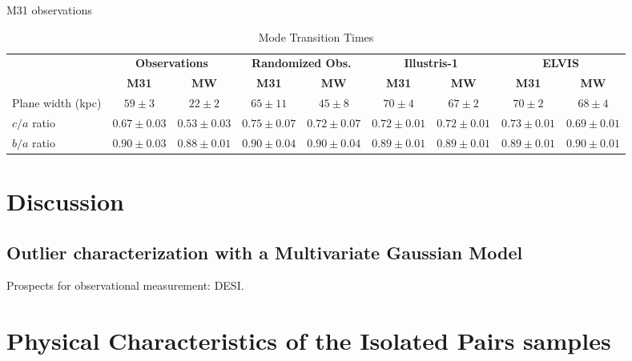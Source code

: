 \documentclass[a4paper,fleqn,usenatbib]{mnras}
\begin{document}
M31 observations 


\begin{table}
  \centering
  \renewcommand{\arraystretch}{1.2}
  \begin{tabular}{|p{2.5cm}|c|c|c|c|c|c|c|c|}
    \hline
    \multirow{2}{4.0cm}{} & \multicolumn{2}{c|}{\textbf{Observations}} & \multicolumn{2}{c|}{\textbf{Randomized Obs.}} & \multicolumn{2}{c|}{\textbf{Illustris-1}} & \multicolumn{2}{c|}{\textbf{ELVIS}}\\
    \cline{2-9}
    & \textbf{M31} & \textbf{MW} & \textbf{M31} & \textbf{MW} & \textbf{M31} & \textbf{MW}& \textbf{M31} & \textbf{MW}\\
    \hline
    Plane width (kpc) & $59\pm 3$  & $22\pm 2$  & $65\pm 11$   & $45\pm 8$     & $70\pm 4$ & $67\pm 2$ & $70\pm 2$& $68\pm 4$ \\\hline
    $c/a$ ratio & $0.67\pm 0.03$ & $0.53\pm 0.03$ & $0.75\pm0.07$ & $0.72\pm 0.07$ & $0.72\pm 0.01$ & $0.72\pm 0.01$ & $0.73\pm 0.01$& $0.69\pm 0.01$ \\ \hline
    $b/a$ ratio & $0.90\pm 0.03$ & $0.88\pm 0.01$ & $0.90\pm0.04$ & $0.90\pm 0.04$ & $0.89\pm 0.01$ & $0.89\pm 0.01$ & $0.89\pm0.01$& $0.90\pm 0.01$\\ \hline
  \end{tabular}
  \caption{Mode Transition Times}
\end{table}

\section{Discussion}
\subsection{Outlier characterization with a Multivariate Gaussian Model}


Prospects for observational measurement: DESI.






\newpage
\appendix

\section{Physical Characteristics of the Isolated Pairs samples}
\end{document}
